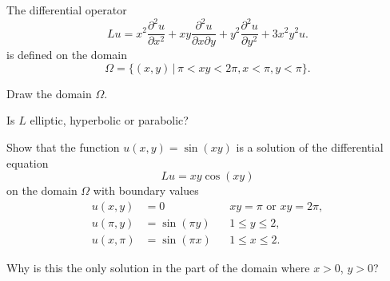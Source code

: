 The differential operator
\[
Lu=
x^2\frac{\partial^2u}{\partial x^2}
+xy\frac{\partial^2u}{\partial x\partial y}
+y^2\frac{\partial^2u}{\partial y^2}
+3x^2y^2u.
\]
is defined on the domain
\[
\Omega=\{
(x,y)\,|\,\pi < xy < 2\pi, x < \pi,y < \pi
\}.
\]
\begin{teilaufgaben}
\item
Draw the domain $\Omega$.
\item
Is $L$ elliptic, hyperbolic or parabolic?
\item
Show that the function $u(x,y)=\sin(xy)$ is a solution of the differential
equation
\[
Lu=xy\cos(xy)
\]
on the domain $\Omega$ with boundary values
\begin{align*}
u(x,y)&=0            &&\text{$xy=\pi$ or $xy=2\pi$},\\
u(\pi,y)&=\sin(\pi y)&&1\le y\le 2,\\
u(x,\pi)&=\sin(\pi x)&&1\le x\le 2.
\end{align*}
\item
Why is this the only solution in the part of the domain where
$x>0$, $y>0$?
\end{teilaufgaben}


